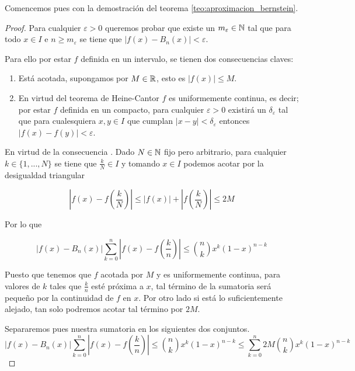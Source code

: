 Comencemos pues con la demostración del teorema \ref{teo:aproximacion_bernstein}.
\begin{proof}
    
    Para cualquier $\varepsilon > 0$ queremos probar que existe un $m_\varepsilon  \in \mathbb{N}$ tal que para 
    todo $x \in I$ e $n \geq m_\varepsilon$  se tiene que 
    $|f(x) - B_n(x)| < \varepsilon$.
    
     Para ello por estar $f$ definida en un intervalo, 
    se tienen dos consecuencias claves: 
    \begin{enumerate}
        \item Está acotada, supongamos por $M \in \mathbb{R}$, esto es $|f(x)| \leq M$. \label{consecuencia:M}
        \item En virtud del teorema de Heine-Cantor $f$ es uniformemente continua, es decir; por estar $f$ definida en un compacto,  para cualquier $\varepsilon >0$ existirá un $\delta_\varepsilon$
        tal que para cualesquiera $x,y \in I$ que cumplan $|x-y| < \delta_\varepsilon$ entonces $|f(x)-f(y)| < \varepsilon$. \label{consecuencia:delta}
    \end{enumerate}
    En virtud de la consecuencia . 
    Dado $N \in  \mathbb{N}$ fijo pero arbitrario, para cualquier $k \in \{1, ..., N\}$ se tiene que
    $\frac{k}{N} \in I$ y tomando $x \in I$ podemos acotar por la desigualdad triangular

    $$\left|f(x)- f\left( \frac{k}{N} \right) \right| \leq |f(x)| + \left|f \left( \frac{k}{N}\right) \right|\leq 2M$$  

    Por lo que 

    \begin{equation*}
        |f(x)-B_n(x)| \sum_{k=0}^n \left|f(x) - f \left( \frac{k}{n} \right)\right| \leq
     \binom{n}{k} x^{k} (1-x)^{n-k}
    \end{equation*}

    Puesto que tenemos que $f$ acotada por $M$ y es uniformemente continua, para valores de $k$ tales que $\frac{k}{n}$ 
    esté próxima a $x$, tal término de la sumatoria será pequeño por la continuidad de $f$ en $x$. Por otro lado
    si está lo suficientemente alejado, tan solo podremos acotar tal término por $2M$. 

    Separaremos pues nuestra sumatoria en los siguientes dos conjuntos.  
    \begin{equation*}
        |f(x)-B_n(x)| \sum_{k=0}^n \left|f(x) - f \left( \frac{k}{n} \right)\right| \leq
     \binom{n}{k} x^{k} (1-x)^{n-k}
     \leq \sum_{k=0}^n 2M 
    \binom{n}{k} x^{k} (1-x)^{n-k}
    \end{equation*}


\end{proof}
